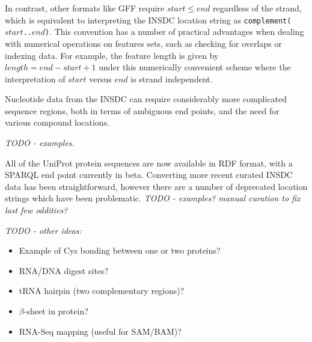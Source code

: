 In contrast, other formats like GFF require $start \leq end$
regardless of the strand, which is equivalent to interpreting
the INSDC location string as \texttt{complement($start$..$end$)}.
This convention has a number of practical advantages when
dealing with numerical operations on features sets, such as
checking for overlaps or indexing data. For example, the
feature length is given by $length = end - start + 1$ under
this numerically convenient scheme where the interpretation
of $start$ versus $end$ is strand independent.

Nucleotide data from the INSDC can require considerably more complicated
sequence regions, both in terms of ambiguous end points, and the need for
various compound locations.

\textit{TODO - examples}.

All of the UniProt protein sequences are now available in RDF format,
with a SPARQL end point currently in beta. Converting more recent
curated INSDC data has been straightforward, however there are a
number of deprecated location strings which have been problematic.
\textit{TODO - examples? manual curation to fix last few oddities?}


\textit{TODO - other ideas:}
\begin{itemize}
\item Example of Cys bonding between one or two proteins?
\item RNA/DNA digest sites?
\item tRNA hairpin (two complementary regions)?
\item $\beta$-sheet in protein?
\item RNA-Seq mapping (useful for SAM/BAM)?
\end{itemize}
